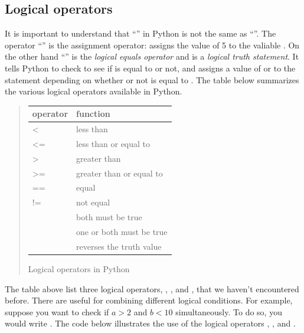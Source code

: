 \documentclass[letterpaper,10pt,english]{sphinxmanual}
\begin{document}

\subsection{Logical operators}
\label{chap6/chap6_loopsconds:logical-operators}\label{chap6/chap6_loopsconds:index-1}
It is important to understand that ``\code{==}'' in Python is not the same as ``\code{=}''.  The operator ``\code{=}'' is the assignment operator:  assigns the value of 5 to the valiable .  On the other hand ``\code{==}'' is the \emph{logical equals operator} and  is a \emph{logical truth statement}.  It tells Python to check to see if  is equal to  or not, and assigns a value of  or  to the statement  depending on whether or not  is equal to .  The table below summarizes the various logical operators available in Python.
\begin{quote}

\begin{tabulary}{\linewidth}{|L|L|}
\hline
\textsf{\relax 
operator
} & \textsf{\relax 
function
}\\
\hline
\textless{}
 & 
less than
\\

\textless{}=
 & 
less than or equal to
\\

\textgreater{}
 & 
greater than
\\

\textgreater{}=
 & 
greater than or equal to
\\

==
 & 
equal
\\

!=
 & 
not equal
\\

 & 
both must be true
\\

 & 
one or both must be true
\\

 & 
reverses the truth value
\\
\hline\end{tabulary}


Logical operators in Python
\end{quote}

The table above list three logical operators, , , and , that we haven't encountered before.  There are useful for combining different logical conditions.  For example, suppose you want to check if \(a>2\) and \(b<10\) simultaneously.  To do so, you would write .  The code below illustrates the use of the logical operators , , and .
\end{document}
